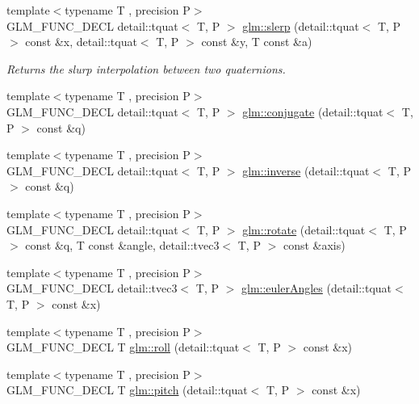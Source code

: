 \begin{DoxyCompactItemize}
{\footnotesize template$<$typename T , precision P$>$ }\\G\+L\+M\+\_\+\+F\+U\+N\+C\+\_\+\+D\+E\+CL detail\+::tquat$<$ T, P $>$ \hyperlink{group__gtc__quaternion_ga7468a211a20ea56ea5cfb0625226868a}{glm\+::slerp} (detail\+::tquat$<$ T, P $>$ const \&x, detail\+::tquat$<$ T, P $>$ const \&y, T const \&a)
\begin{DoxyCompactList}\small\item\em Returns the slurp interpolation between two quaternions. \end{DoxyCompactList}\item 
{\footnotesize template$<$typename T , precision P$>$ }\\G\+L\+M\+\_\+\+F\+U\+N\+C\+\_\+\+D\+E\+CL detail\+::tquat$<$ T, P $>$ \hyperlink{group__gtc__quaternion_gaf78006c47276b151777fc194cf11a688}{glm\+::conjugate} (detail\+::tquat$<$ T, P $>$ const \&q)
\item 
{\footnotesize template$<$typename T , precision P$>$ }\\G\+L\+M\+\_\+\+F\+U\+N\+C\+\_\+\+D\+E\+CL detail\+::tquat$<$ T, P $>$ \hyperlink{group__gtc__quaternion_ga6613ef61cb980a18f19ece5f421564da}{glm\+::inverse} (detail\+::tquat$<$ T, P $>$ const \&q)
\item 
{\footnotesize template$<$typename T , precision P$>$ }\\G\+L\+M\+\_\+\+F\+U\+N\+C\+\_\+\+D\+E\+CL detail\+::tquat$<$ T, P $>$ \hyperlink{group__gtc__quaternion_gaa9a8891f03d8f5373525c4b3159c1c73}{glm\+::rotate} (detail\+::tquat$<$ T, P $>$ const \&q, T const \&angle, detail\+::tvec3$<$ T, P $>$ const \&axis)
\item 
{\footnotesize template$<$typename T , precision P$>$ }\\G\+L\+M\+\_\+\+F\+U\+N\+C\+\_\+\+D\+E\+CL detail\+::tvec3$<$ T, P $>$ \hyperlink{group__gtc__quaternion_gade4034f49ccadf63cb31a7fb5fa3c8aa}{glm\+::euler\+Angles} (detail\+::tquat$<$ T, P $>$ const \&x)
\item 
{\footnotesize template$<$typename T , precision P$>$ }\\G\+L\+M\+\_\+\+F\+U\+N\+C\+\_\+\+D\+E\+CL T \hyperlink{group__gtc__quaternion_ga6d883e423bc425f4334fcce202131f7e}{glm\+::roll} (detail\+::tquat$<$ T, P $>$ const \&x)
\item 
{\footnotesize template$<$typename T , precision P$>$ }\\G\+L\+M\+\_\+\+F\+U\+N\+C\+\_\+\+D\+E\+CL T \hyperlink{group__gtc__quaternion_ga4d345dc369a54f53f5ebc375bac56d11}{glm\+::pitch} (detail\+::tquat$<$ T, P $>$ const \&x)

\end{DoxyCompactItemize}
